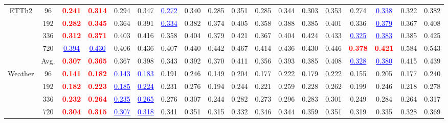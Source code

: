 \begin{table}[t]
{\begin{tabular}{cc|cc|cc|cc|cc|cc|cc|cc|cc}
\midrule
\multirow{5}{*}{ETTh2} & 96 & \textcolor{red}{\textbf{0.241}} & \textcolor{red}{\textbf{0.314}} & 0.294 & 0.347 & \textcolor{blue}{\underline{0.272}} & 0.340 & 0.285 & 0.351 & 0.285 & 0.344 & 0.303 & 0.353 & 0.274 & \textcolor{blue}{\underline{0.338}} & 0.322 & 0.382 \\
 & 192 & \textcolor{red}{\textbf{0.282}} & \textcolor{red}{\textbf{0.345}} & 0.364 & 0.391 & \textcolor{blue}{\underline{0.334}} & 0.382 & 0.374 & 0.405 & 0.358 & 0.388 & 0.385 & 0.401 & 0.336 & \textcolor{blue}{\underline{0.379}} & 0.367 & 0.408 \\
 & 336 & \textcolor{red}{\textbf{0.312}} & \textcolor{red}{\textbf{0.371}} & 0.403 & 0.416 & 0.358 & 0.404 & 0.379 & 0.421 & 0.367 & 0.404 & 0.424 & 0.433 & \textcolor{blue}{\underline{0.325}} & \textcolor{blue}{\underline{0.383}} & 0.385 & 0.425 \\
 & 720 & \textcolor{blue}{\underline{0.394}} & \textcolor{blue}{\underline{0.430}} & 0.406 & 0.436 & 0.407 & 0.440 & 0.442 & 0.467 & 0.414 & 0.436 & 0.430 & 0.446 & \textcolor{red}{\textbf{0.378}} & \textcolor{red}{\textbf{0.421}} & 0.584 & 0.543 \\
\cmidrule(lr){2-18}
 & Avg. & \textcolor{red}{\textbf{0.307}} & \textcolor{red}{\textbf{0.365}} & 0.367 & 0.398 & 0.343 & 0.392 & 0.370 & 0.411 & 0.356 & 0.393 & 0.385 & 0.408 & \textcolor{blue}{\underline{0.328}} & \textcolor{blue}{\underline{0.380}} & 0.415 & 0.439 \\
\midrule
\multirow{5}{*}{Weather} & 96 & \textcolor{red}{\textbf{0.141}} & \textcolor{red}{\textbf{0.182}} & \textcolor{blue}{\underline{0.143}} & \textcolor{blue}{\underline{0.183}} & 0.191 & 0.246 & 0.149 & 0.204 & 0.177 & 0.222 & 0.179 & 0.222 & 0.155 & 0.205 & 0.177 & 0.240 \\
 & 192 & \textcolor{red}{\textbf{0.182}} & \textcolor{red}{\textbf{0.223}} & \textcolor{blue}{\underline{0.185}} & \textcolor{blue}{\underline{0.224}} & 0.231 & 0.276 & 0.194 & 0.244 & 0.221 & 0.259 & 0.228 & 0.262 & 0.199 & 0.246 & 0.218 & 0.278 \\
 & 336 & \textcolor{red}{\textbf{0.232}} & \textcolor{red}{\textbf{0.264}} & \textcolor{blue}{\underline{0.235}} & \textcolor{blue}{\underline{0.265}} & 0.276 & 0.307 & 0.244 & 0.282 & 0.273 & 0.296 & 0.283 & 0.301 & 0.249 & 0.284 & 0.264 & 0.317 \\
 & 720 & \textcolor{red}{\textbf{0.304}} & \textcolor{red}{\textbf{0.315}} & \textcolor{blue}{\underline{0.307}} & \textcolor{blue}{\underline{0.318}} & 0.341 & 0.351 & 0.315 & 0.332 & 0.346 & 0.344 & 0.359 & 0.351 & 0.319 & 0.335 & 0.328 & 0.369 \\

\end{tabular}}
\end{table}
